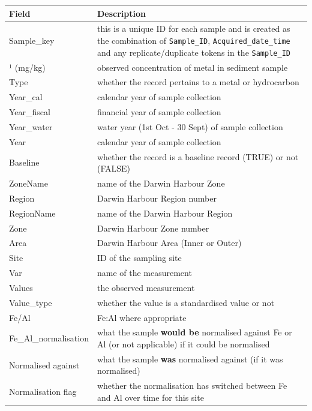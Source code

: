 \documentclass[
  8pt,
  a4paper]{article}
\begin{document}
\begin{longtable}[]{@{}
  >{\raggedright\arraybackslash}p{}
  >{\raggedright\arraybackslash}p{}@{}}
\toprule\noalign{}
\begin{minipage}[b]{\linewidth}\raggedright
Field
\end{minipage} & \begin{minipage}[b]{\linewidth}\raggedright
Description
\end{minipage} \\
\midrule\noalign{}
\endhead
\bottomrule\noalign{}
\endlastfoot
Sample\_key & this is a unique ID for each sample and is created as the
combination of \texttt{Sample\_ID}, \texttt{Acquired\_date\_time} and
any replicate/duplicate tokens in the \texttt{Sample\_ID} \\
*¹ (mg/kg) & observed concentration of metal in sediment sample \\
Type & whether the record pertains to a metal or hydrocarbon \\
Year\_cal & calendar year of sample collection \\
Year\_fiscal & financial year of sample collection \\
Year\_water & water year (1st Oct - 30 Sept) of sample collection \\
Year & calendar year of sample collection \\
Baseline & whether the record is a baseline record (TRUE) or not
(FALSE) \\
ZoneName & name of the Darwin Harbour Zone \\
Region & Darwin Harbour Region number \\
RegionName & name of the Darwin Harbour Region \\
Zone & Darwin Harbour Zone number \\
Area & Darwin Harbour Area (Inner or Outer) \\
Site & ID of the sampling site \\
Var & name of the measurement \\
Values & the observed measurement \\
Value\_type & whether the value is a standardised value or not \\
Fe/Al & Fe:Al where appropriate \\
Fe\_Al\_normalisation & what the sample \textbf{would be} normalised
against Fe or Al (or not applicable) if it could be normalised \\
Normalised against & what the sample \textbf{was} normalised against (if
it was normalised) \\
Normalisation flag & whether the normalisation has switched between Fe
and Al over time for this site \\
\end{longtable}
\end{document}
